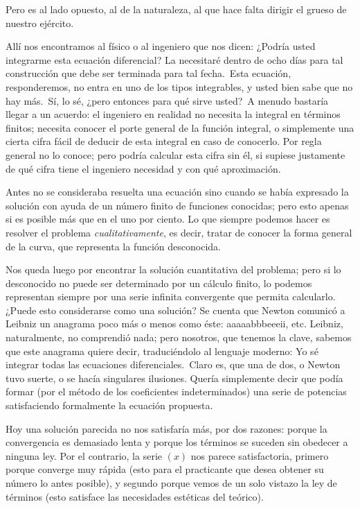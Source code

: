 \documentclass[a4paper, 12pt]{article}
\begin{document}
Pero es al lado opuesto, al de la naturaleza, al que hace falta dirigir el
grueso de nuestro ejército.

Allí nos encontramos al físico o al ingeniero que nos dicen: \guillemotleft ¿Podría usted integrarme esta ecuación
diferencial? La necesitaré dentro de ocho días para tal construcción que debe ser terminada para tal fecha.\guillemotright \ 
\guillemotleft Esta ecuación, responderemos,
no entra en uno de los tipos integrables, y usted bien sabe que no hay más.\guillemotright \  \guillemotleft Sí, lo sé, ¿pero entonces
para qué sirve usted?\guillemotright\   A menudo bastaría llegar a
un acuerdo: el ingeniero en realidad no necesita la integral en términos
finitos; necesita conocer el porte general de la función integral, o
simplemente una cierta cifra fácil de deducir de esta integral en caso
de conocerlo. Por regla general no lo conoce; pero podría calcular
esta cifra sin él, si supiese justamente de qué cifra tiene el
ingeniero necesidad y con qué aproximación.

Antes no se consideraba resuelta una ecuación sino cuando se había
expresado la solución con ayuda de un número finito de funciones
conocidas; pero esto apenas si es posible más que en el uno por ciento.
Lo que siempre podemos hacer es resolver el problema {\it cualitativamente}, es
decir, tratar de conocer la forma general de la curva, que representa la
función desconocida.

Nos queda luego por encontrar la solución cuantitativa del problema;
pero si lo desconocido no puede ser determinado por un cálculo finito,
lo podemos representan siempre por una serie infinita convergente que
permita calcularlo. ¿Puede esto considerarse como una solución? Se
cuenta que Newton comunicó a Leibniz un anagrama poco más o menos
como éste: aaaaabbbeeeii, etc. Leibniz, naturalmente, no comprendió
nada; pero nosotros, que tenemos la clave, sabemos que este anagrama quiere
decir, traduciéndolo al lenguaje moderno: \guillemotleft Yo sé
integrar todas las ecuaciones diferenciales.\guillemotright\  Claro es, que
una de dos, o Newton tuvo suerte, o se hacía singulares ilusiones. Quería simplemente decir que podía formar (por el método de los
coeficientes indeterminados) una serie de potencias satisfaciendo
formalmente la ecuación propuesta.

Hoy una solución parecida no nos satisfaría más, por dos
razones: porque la convergencia es demasiado lenta y porque los términos
se suceden sin obedecer a ninguna ley. Por el contrario, la serie $(x)$ nos
parece satisfactoria, primero porque converge muy rápida (esto para el
practicante que desea obtener su número lo antes posible), y segundo
porque vemos de un solo vistazo la ley de términos (esto satisface las
necesidades estéticas del teórico).
\end{document}
